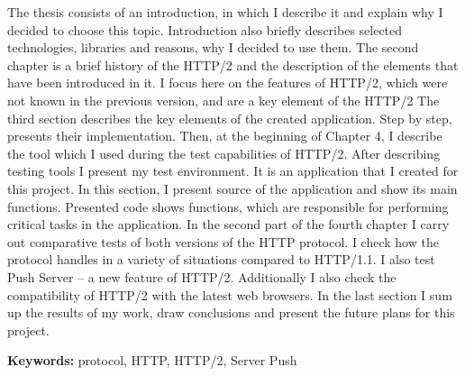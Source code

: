 The thesis consists of an introduction, in which I describe it and explain why I decided to choose this topic.
Introduction also briefly describes selected technologies, libraries and reasons, why I decided to use them.
The second chapter is a brief history of the HTTP/2 and the description of the elements that have been introduced in it.
I focus here on the features of HTTP/2, which were not known in the previous version, and are a key element of the HTTP/2
The third section describes the key elements of the created application.
Step by step, presents their implementation.
Then, at the beginning of Chapter 4, I describe the tool which I used during the test capabilities of HTTP/2.
After describing testing tools I present my test environment.
It is an application that I created for this project.
In this section, I present source of the application and show its main functions.
Presented code shows functions, which are responsible for performing critical tasks in the application.
In the second part of the fourth chapter I carry out comparative tests of both versions of the HTTP protocol.
I check how the protocol handles in a variety of situations compared to HTTP/1.1.
I also test Push Server -- a new feature of HTTP/2.
Additionally I also check the compatibility of HTTP/2 with the latest web browsers.
In the last section I sum up the results of my work, draw conclusions and present the future plans for this project.

\bigskip
{\noindent\bf Keywords:} protocol, HTTP, HTTP/2, Server Push

\vfill